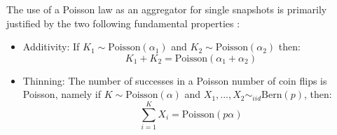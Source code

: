 The use of a Poisson law as an aggregator for single snapshots is primarily justified by the two following fundamental properties \cite{orbanz2015bayesian}:                                                       
\begin{itemize}                                                                                                                                                                                                    
\item{Additivity}: If $K_1 \sim \mathrm{Poisson}(\alpha_1)$ and $K_2 \sim \mathrm{Poisson}(\alpha_2)$ then:                                                                                                        
    \begin{equation}                                                                                                                                                                                               
        K_1 + K_2 = \mathrm{Poisson}(\alpha_1 + \alpha_2)                                                                                                                                                          
    \end{equation}                                                                                                                                                                                                 
\item {Thinning}: The number of successes in a Poisson number of coin flips is Poisson, namely if $K \sim \mathrm{Poisson}(\alpha)$ and $X_1,...,X_2 \sim_{iid} \mathrm{Bern}(p)$, then:                           
    \begin{equation}                                                                                                                                                                                               
        \sum_{i=1}^K X_i = \mathrm{Poisson}(p\alpha)                                                                                                                                                               
    \end{equation}                                                                                                                                                                                                 
\end{itemize}                                                                                                                                                                                                      
                                                                                                                                                                                                                   
